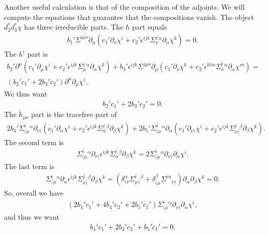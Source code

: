 \documentclass[10pt]{report}
\theoremstyle{definition}
\begin{document}
Another useful calculation is that of the composition of the adjoints. We will compute the equations that guarantee that the compositions vanish. 
The object $d_2^* d_3^* \chi$ has three irreducible parts. The $h$ part equals
\begin{align}
b_1' \Sigma^{i\mu\nu} \partial_\mu ( c_1' \partial_\nu \chi^i + c_2' \epsilon^{ijk} \Sigma^j_\nu{}^\alpha \partial_\alpha\chi^k) =0.
\end{align}
The $h^i$ part is
\begin{align}
b_2' \partial^\mu (c_1' \partial_\mu \chi^i + c_2' \epsilon^{ijk} \Sigma^j_\mu{}^\alpha \partial_\alpha \chi^k) + b_3' \epsilon^{ijk} \Sigma^{j\mu\nu} \partial_\mu (c_1' \partial_\nu \chi^k + c_2' \epsilon^{klm} \Sigma^l_\nu{}^\alpha \partial_\alpha \chi^m) = \\ \nonumber
(b_2' c_1' + 2b_3' c_2' ) \partial^\mu  \partial_\mu \chi^i .
\end{align}
We thus want
\begin{align}
b_2' c_1' + 2b_3' c_2' =0.
\end{align}
The $\tilde{h}_{\mu\nu}$ part is the tracefree part of 
\begin{align}
2b_4' \Sigma^i_{(\mu}{}^\alpha \partial_{\nu)}( c_1' \partial_\alpha \chi^i + c_2' \epsilon^{ijk} \Sigma^j_\alpha{}^\beta \partial_\beta \chi^k) 
 +  2b_5' \Sigma^i_{(\mu}{}^\alpha \partial_\alpha ( c_1' \partial_{\nu)} \chi^i + c_2' \epsilon^{ijk} \Sigma^j_{\nu)}{}^\beta \partial_\beta \chi^k) .
 \end{align}
 The second term is
 \begin{align}
 \Sigma^i_{(\mu}{}^\alpha \partial_{\nu)}\epsilon^{ijk} \Sigma^j_\alpha{}^\beta \partial_\beta \chi^k = 2 \Sigma^i_{(\mu}{}^\alpha \partial_{\nu)} \partial_\alpha\chi^i.
 \end{align}
 The last term is
 \begin{align}
 \Sigma^i_{(\mu}{}^\alpha \partial_\alpha \epsilon^{ijk} \Sigma^j_{\nu)}{}^\beta \partial_\beta \chi^k = ( \delta^\alpha_{(\nu} \Sigma^i_{\mu)}{}^\beta + \delta^\beta_{(\mu} \Sigma^{i\alpha}{}_{\nu)}) \partial_\alpha\partial_\beta \chi^k=0.
 \end{align}
 So, overall we have
 \begin{align}
 (2b_4' c_1' + 4b_4' c_2' +2b_5' c_1') \Sigma^i_{(\mu}{}^\alpha \partial_{\nu)} \partial_\alpha \chi^i ,
 \end{align}
 and thus we want
 \begin{align}
 b_4' c_1' + 2b_4' c_2' +b_5' c_1'=0.
 \end{align}
 
\end{document}
